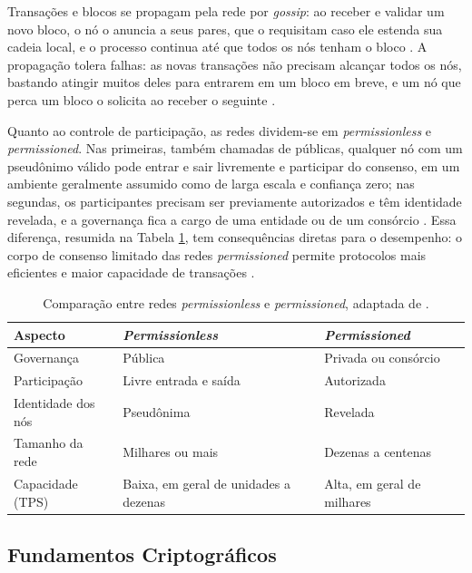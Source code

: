 Transações e blocos se propagam pela rede por \textit{gossip}: ao receber e validar um novo bloco, o nó o anuncia a seus pares, que o requisitam caso ele estenda sua cadeia local, e o processo continua até que todos os nós tenham o bloco \cite{Xiao2020}. A propagação tolera falhas: as novas transações não precisam alcançar todos os nós, bastando atingir muitos deles para entrarem em um bloco em breve, e um nó que perca um bloco o solicita ao receber o seguinte \cite{nakamoto2008bitcoin}.

Quanto ao controle de participação, as redes dividem-se em \textit{permissionless} e \textit{permissioned}. Nas primeiras, também chamadas de públicas, qualquer nó com um pseudônimo válido pode entrar e sair livremente e participar do consenso, em um ambiente geralmente assumido como de larga escala e confiança zero; nas segundas, os participantes precisam ser previamente autorizados e têm identidade revelada, e a governança fica a cargo de uma entidade ou de um consórcio \cite{Xiao2020}. Essa diferença, resumida na Tabela \ref{tab:permissionless}, tem consequências diretas para o desempenho: o corpo de consenso limitado das redes \textit{permissioned} permite protocolos mais eficientes e maior capacidade de transações \cite{Xiao2020}.

\begin{table}[!hbtp]
    \centering
    \small
    \caption{Comparação entre redes \textit{permissionless} e \textit{permissioned}, adaptada de \cite{Xiao2020}.}
    \label{tab:permissionless}
    \begin{tabular}{p{1.9cm} p{3cm} p{3cm}}
        \hline
        \textbf{Aspecto} & \textbf{\textit{Permissionless}} & \textbf{\textit{Permissioned}} \\
        \hline
        Governança & Pública & Privada ou consórcio \\
        Participação & Livre entrada e saída & Autorizada \\
        Identidade dos nós & Pseudônima & Revelada \\
        Tamanho da rede & Milhares ou mais & Dezenas a centenas \\
        Capacidade (TPS) & Baixa, em geral de unidades a dezenas & Alta, em geral de milhares \\
        \hline
    \end{tabular}
\end{table}

\subsection{Fundamentos Criptográficos}
\label{subsec:cripto}

